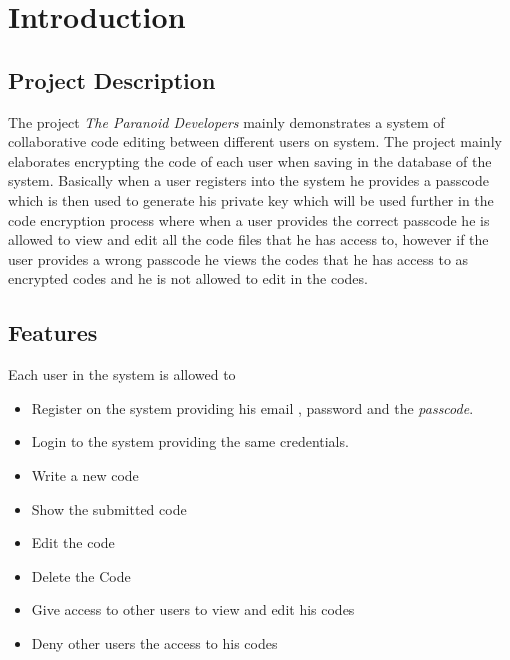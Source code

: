 \chapter{Introduction}

\section{Project Description}
The project \textit{The Paranoid Developers} mainly demonstrates a system of collaborative code editing between different users on system. The project mainly elaborates encrypting the code of each user when saving in the database of the system. Basically when a user registers into the system he provides a passcode which is then used to generate his private key which will be used further in the code encryption process where when a user provides the correct passcode he is allowed to view and edit all the code files that he has access to, however if the user provides a wrong passcode he views the codes that he has access to as encrypted codes and he is not allowed to edit in the codes.



\section{Features}
 Each user in the system is allowed to  \begin{itemize}
    \item Register on the system providing his email , password and the \textit{passcode}.
     \item Login to the system providing the same credentials.
    \item Write a new code
    \item  Show the submitted code 
    \item  Edit the code 
    \item Delete the Code 
    \item Give access to other users to view and edit his codes
    \item Deny other users the access to his codes
\end{itemize}